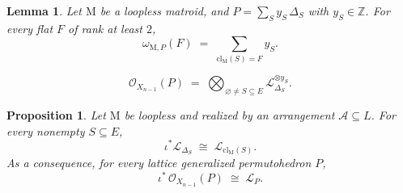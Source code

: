 \documentclass[10pt,a4paper]{amsart}
\newtheorem{lemma}{Lemma}
\newtheorem{proposition}{Proposition}
\newcommand{\M}{\mathrm{M}}
\def\Z{\mathbb{Z}}
\newcommand{\cL}{\mathcal{L}}
\newcommand{\cO}{\mathcal{O}}
\def\calA{\mathcal{A}}
\newcommand{\cl}{\textrm{cl}}
\renewcommand{\emptyset}{\varnothing}
\begin{document}
\begin{lemma}
  \label{lem:support-general}
  Let $\M$ be a loopless matroid, and $P = \sum_{S} y_S\,\Delta_S$ with $y_S \in \Z$. For every flat $F$ of rank at least $2$,
  \[
    \omega_{\M, P}(F) \;=\; \sum_{\cl_{\M}(S) = F} y_S .
  \]
\end{lemma}

\begin{equation}\label{eq:OP}
  \cO_{X_{n-1}}(P) \;=\; \bigotimes_{\emptyset \ne S \subseteq E}
  \cL_{\Delta_S}^{\otimes y_S} .
\end{equation}

\begin{proposition}\label{prop:pullback}
  Let $\M$ be loopless and realized by an arrangement $\calA \subseteq L$.  For
  every nonempty $S \subseteq E$,
  \[
    \iota^{*} \cL_{\Delta_S} \;\cong\; \cL_{\cl_{\M}(S)} .
  \]
  As a consequence, for every lattice generalized permutohedron $P$,
  \[
    \iota^{*}\, \cO_{X_{n-1}}(P) \;\cong\; \cL_P .
  \]
\end{proposition}
\end{document}
